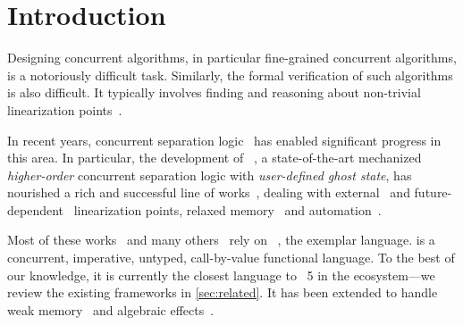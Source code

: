 \section{Introduction}
\label{sec:introduction}

Designing concurrent algorithms, in particular fine-grained concurrent algorithms, is a notoriously difficult task.
Similarly, the formal verification of such algorithms is also difficult.
It typically involves finding and reasoning about non-trivial linearization points~\cite{DBLP:journals/csur/DongolD15,DBLP:journals/pacmpl/JungLPRTDJ20,DBLP:conf/cpp/VindumB21,DBLP:conf/cpp/VindumFB22,DBLP:conf/osdi/Chang0STKZ23}.

In recent years, concurrent separation logic~\cite{DBLP:journals/siglog/BrookesO16} has enabled significant progress in this area.
In particular, the development of \Iris~\cite{DBLP:journals/jfp/JungKJBBD18}, a state-of-the-art mechanized \emph{higher-order} concurrent separation logic with \emph{user-defined ghost state}, has nourished a rich and successful line of works~\cite{DBLP:journals/pacmpl/JungLPRTDJ20,DBLP:conf/cpp/VindumB21,DBLP:conf/cpp/VindumFB22,DBLP:conf/osdi/Chang0STKZ23,DBLP:conf/cpp/CarbonneauxZKON22,DBLP:journals/pacmpl/JungLCKPK23,DBLP:journals/pacmpl/SomersK24,DBLP:journals/pacmpl/MevelJP20,DBLP:journals/pacmpl/MevelJ21,DBLP:conf/pldi/DangJCNMKD22,DBLP:journals/pacmpl/ParkKMJLKK24,DBLP:conf/pldi/MulderKG22,DBLP:journals/pacmpl/MulderK23}, dealing with external~\cite{DBLP:conf/cpp/VindumFB22} and future-dependent~\cite{DBLP:journals/pacmpl/JungLPRTDJ20,DBLP:conf/cpp/VindumB21,DBLP:conf/osdi/Chang0STKZ23} linearization points, relaxed memory~\cite{DBLP:journals/pacmpl/MevelJP20,DBLP:journals/pacmpl/MevelJ21,DBLP:conf/pldi/DangJCNMKD22,DBLP:journals/pacmpl/ParkKMJLKK24} and automation~\cite{DBLP:conf/pldi/MulderKG22,DBLP:journals/pacmpl/MulderK23}.

Most of these works~\cite{DBLP:journals/pacmpl/JungLPRTDJ20,DBLP:conf/cpp/VindumB21,DBLP:conf/cpp/VindumFB22,DBLP:conf/cpp/CarbonneauxZKON22,DBLP:journals/pacmpl/JungLCKPK23,DBLP:journals/pacmpl/SomersK24,DBLP:conf/pldi/MulderKG22,DBLP:journals/pacmpl/MulderK23} and many others~\cite{DBLP:journals/pacmpl/VilhenaPJ20,DBLP:journals/pacmpl/PottierGJM24,DBLP:journals/pacmpl/TimanyGB24,DBLP:journals/pacmpl/LorenzenLSL24} rely on \HeapLang~\cite{iris}, the exemplar \Iris language.
\HeapLang is a concurrent, imperative, untyped, call-by-value functional language.
To the best of our knowledge, it is currently the closest language to \OCaml~5 in the \Iris ecosystem---we review the existing frameworks in \cref{sec:related}.
It has been extended to handle weak memory~\cite{DBLP:journals/pacmpl/MevelJP20} and algebraic effects~\cite{DBLP:journals/pacmpl/VilhenaP21}.

